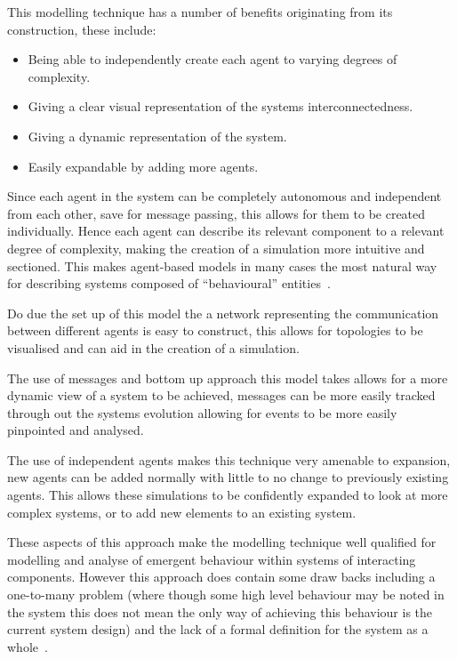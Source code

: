 \documentclass{article}
\begin{document}
This modelling technique has a number of benefits originating from its construction, these include:
\begin{itemize}
   \item Being able to independently create each agent to varying degrees of complexity. 
   \item Giving a clear visual representation of the systems interconnectedness.
   \item Giving a dynamic representation of the system.
   \item Easily expandable by adding more agents.  
\end{itemize} 

Since each agent in the system can be completely autonomous and independent from each other, save for message passing, this allows for them to be created individually. Hence each agent can describe its relevant component to a relevant degree of complexity, making the creation of a simulation more intuitive and sectioned. This makes agent-based models in many cases the most natural way for describing systems composed of ``behavioural'' entities~\cite{techsadsProbsabm}.

Do due the set up of this model the a network representing the communication between different agents is easy to construct, this allows for topologies to be visualised and can aid in the creation of a simulation.    

The use of messages and bottom up approach this model takes allows for a more dynamic view of a system to be achieved, messages can be more easily tracked through out the systems evolution allowing for events to be more easily pinpointed and analysed.  

The use of independent agents makes this technique very amenable to expansion, new agents can be added normally with little to no change to previously existing agents. This allows these simulations to be confidently expanded to look at more complex systems, or to add new elements to an existing system.  

These aspects of this approach make the modelling technique well qualified for modelling and analyse of emergent behaviour within systems of interacting components. However this approach does contain some draw backs including a one-to-many problem (where though some high level behaviour may be noted in the system this does not mean the only way of achieving this behaviour is the current system design) and the lack of a formal definition for the system as a whole~\cite{agbntj}.  
\end{document}
